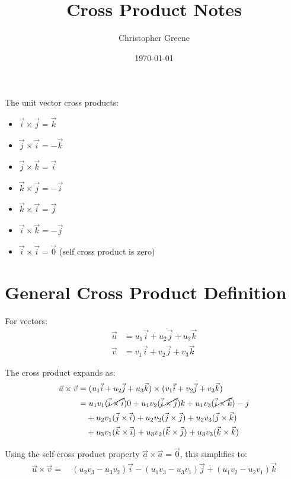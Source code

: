 \documentclass{article}
\title{Cross Product Notes}
\author{Christopher Greene}
\date{\today}
\begin{document}
\maketitle

The unit vector cross products:
\begin{itemize}
    \item $\vec{i} \times \vec{j} = \vec{k}$
    \item $\vec{j} \times \vec{i} = -\vec{k}$
    \item $\vec{j} \times \vec{k} = \vec{i}$
    \item $\vec{k} \times \vec{j} = -\vec{i}$
    \item $\vec{k} \times \vec{i} = \vec{j}$
    \item $\vec{i} \times \vec{k} = -\vec{j}$
    \item $\vec{i} \times \vec{i} = \vec{0}$ (self cross product is zero)
\end{itemize}

\section*{General Cross Product Definition}
For vectors:
\begin{align*}
    \vec{u} &= u_1\vec{i} + u_2\vec{j} + u_3\vec{k} \\
    \vec{v} &= v_1\vec{i} + v_2\vec{j} + v_3\vec{k}
\end{align*}

The cross product expands as:
\begin{align*}
    \vec{u} \times \vec{v} &= (u_1\vec{i} + u_2\vec{j} + u_3\vec{k}) \times (v_1\vec{i} + v_2\vec{j} + v_3\vec{k}) \\
    &= u_1v_1(\cancel{\vec{i} \times \vec{i}} )0 + u_1v_2(\cancel{\vec{i} \times \vec{j}} )k + u_1v_3(\cancel{\vec{i} \times \vec{k}})-j \\
    &\quad + u_2v_1(\vec{j} \times \vec{i}) + u_2v_2(\vec{j} \times \vec{j}) + u_2v_3(\vec{j} \times \vec{k}) \\
    &\quad + u_3v_1(\vec{k} \times \vec{i}) + u_3v_2(\vec{k} \times \vec{j}) + u_3v_3(\vec{k} \times \vec{k})
\end{align*}

Using the self-cross product property $\vec{a} \times \vec{a} = \vec{0}$, this simplifies to:
\begin{align*}
    \vec{u} \times \vec{v} = &\ (u_2v_3 - u_3v_2)\vec{i} - (u_1v_3 - u_3v_1)\vec{j} + (u_1v_2 - u_2v_1)\vec{k}
\end{align*}
\end{document}
